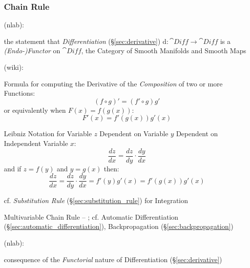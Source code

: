 \subsubsection{Chain Rule}\label{sec:chain_rule}

(nlab):

the statement that \emph{Differentiation} (\S\ref{sec:derivative}) $\mathrm{d} :
\cat{Diff} \rightarrow \cat{Diff}$ is a \emph{(Endo-)Functor} on $\cat{Diff}$,
the Category of Smooth Manifolds and Smooth Maps

(wiki):

Formula for computing the Derivative of the \emph{Composition} of two or more
Functions:
\[
  (f \circ g)' = (f' \circ g) g'
\]
or equivalently when $F(x) = f(g(x))$:
\[
  F'(x) = f'(g(x))g'(x)
\]

Leibniz Notation for Variable $z$ Dependent on Variable $y$ Dependent on
Independent Variable $x$:
\[
  \frac{dz}{dx} = \frac{dz}{dy} \cdot \frac{dy}{dx}
\]
and if $z = f(y)$ and $y = g(x)$ then:
\[
  \frac{dz}{dx} = \frac{dz}{dy} \cdot \frac{dy}{dx}
    = f'(y)g'(x) = f'(g(x))g'(x)
\]

\fist cf. \emph{Substitution Rule} (\S\ref{sec:substitution_rule}) for
Integration

Multivariable Chain Rule -- ; cf. Automatic Differentiation
(\S\ref{sec:automatic_differentiation}), Backpropagation
(\S\ref{sec:backpropagation})

(nlab):

consequence of the \emph{Functorial} nature of Differentiation
(\S\ref{sec:derivative})

